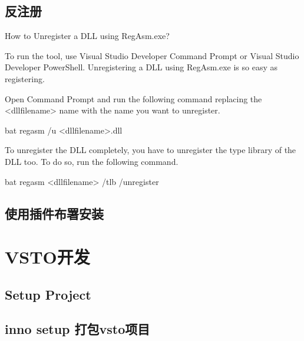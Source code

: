\documentclass[math,code]{amznotes}
\begin{document}
	\section{反注册\cite{COM_unregistry}}
	How to Unregister a DLL using RegAsm.exe?\cite{RegAsm_unregiste}
	
	To run the tool, use Visual Studio Developer Command Prompt or Visual Studio Developer PowerShell. Unregistering a DLL using RegAsm.exe is so easy as registering.
	
	Open Command Prompt and run the following command replacing the <dllfilename> name with the name you want to unregister.
	\begin{amzcode}{bat}
	regasm /u <dllfilename>.dll
	\end{amzcode}
	To unregister the DLL completely, you have to unregister the type library of the DLL too. To do so, run the following command.
	\begin{amzcode}{bat}
	regasm <dllfilename> /tlb /unregister
	\end{amzcode}
	
	\section{使用插件布署安装}
	
	
\chapter{VSTO开发}
	\section{Setup Project}
	\section{inno setup 打包vsto项目}
    \amzindex
	
	
\end{document}
